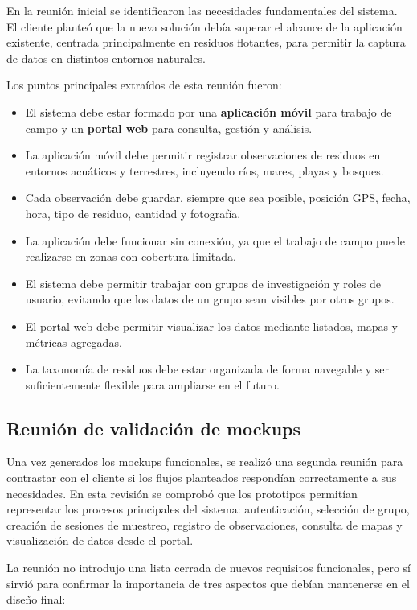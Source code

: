 En la reunión inicial se identificaron las necesidades fundamentales del sistema.
El cliente planteó que la nueva solución debía superar el alcance de la aplicación
existente, centrada principalmente en residuos flotantes, para permitir la captura
de datos en distintos entornos naturales.

Los puntos principales extraídos de esta reunión fueron:

\begin{itemize}
  \item El sistema debe estar formado por una \textbf{aplicación móvil} para trabajo
    de campo y un \textbf{portal web} para consulta, gestión y análisis.
  \item La aplicación móvil debe permitir registrar observaciones de residuos en
    entornos acuáticos y terrestres, incluyendo ríos, mares, playas y bosques.
  \item Cada observación debe guardar, siempre que sea posible, posición GPS, fecha,
    hora, tipo de residuo, cantidad y fotografía.
  \item La aplicación debe funcionar sin conexión, ya que el trabajo de campo puede
    realizarse en zonas con cobertura limitada.
  \item El sistema debe permitir trabajar con grupos de investigación y roles de
    usuario, evitando que los datos de un grupo sean visibles por otros grupos.
  \item El portal web debe permitir visualizar los datos mediante listados, mapas y
    métricas agregadas.
  \item La taxonomía de residuos debe estar organizada de forma navegable y ser
    suficientemente flexible para ampliarse en el futuro.
\end{itemize}

\subsection{Reunión de validación de mockups}

Una vez generados los mockups funcionales, se realizó una segunda reunión para
contrastar con el cliente si los flujos planteados respondían correctamente a sus
necesidades. En esta revisión se comprobó que los prototipos permitían representar
los procesos principales del sistema: autenticación, selección de grupo, creación de
sesiones de muestreo, registro de observaciones, consulta de mapas y visualización
de datos desde el portal.

La reunión no introdujo una lista cerrada de nuevos requisitos funcionales, pero sí
sirvió para confirmar la importancia de tres aspectos que debían mantenerse en el
diseño final:

